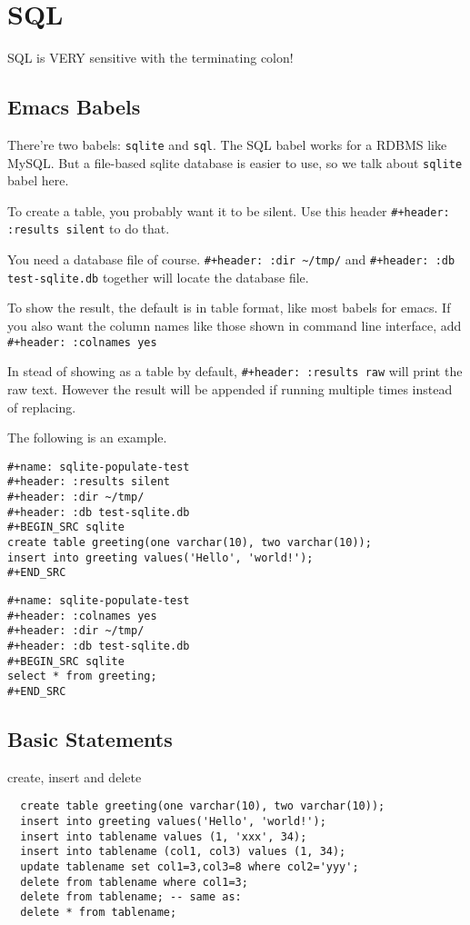 \section{SQL}

SQL is VERY sensitive with the terminating colon!

\subsection{Emacs Babels}
There're two babels: \texttt{sqlite} and \texttt{sql}. The SQL babel
works for a RDBMS like MySQL.  But a file-based sqlite database is
easier to use, so we talk about \texttt{sqlite} babel here.

To create a table, you probably want it to be silent.  Use this header
\verb$#+header: :results silent$ to do that.

You need a database file of course.  \verb$#+header: :dir ~/tmp/$ and
\verb$#+header: :db test-sqlite.db$ together will locate the database
file.

To show the result, the default is in table format, like most babels
for emacs.  If you also want the column names like those shown in
command line interface, add \verb$#+header: :colnames yes$

In stead of showing as a table by default,
\verb$#+header: :results raw$ will print the raw text.  However the
result will be appended if running multiple times instead of
replacing.

The following is an example.

\begin{lstlisting}
#+name: sqlite-populate-test
#+header: :results silent
#+header: :dir ~/tmp/
#+header: :db test-sqlite.db
#+BEGIN_SRC sqlite
create table greeting(one varchar(10), two varchar(10));
insert into greeting values('Hello', 'world!');
#+END_SRC
\end{lstlisting}

\begin{lstlisting}
#+name: sqlite-populate-test
#+header: :colnames yes
#+header: :dir ~/tmp/
#+header: :db test-sqlite.db
#+BEGIN_SRC sqlite
select * from greeting;
#+END_SRC
\end{lstlisting}

\subsection{Basic Statements}
create, insert and delete
\begin{lstlisting}
  create table greeting(one varchar(10), two varchar(10));
  insert into greeting values('Hello', 'world!');
  insert into tablename values (1, 'xxx', 34);
  insert into tablename (col1, col3) values (1, 34);
  update tablename set col1=3,col3=8 where col2='yyy';
  delete from tablename where col1=3;
  delete from tablename; -- same as:
  delete * from tablename;
\end{lstlisting}

